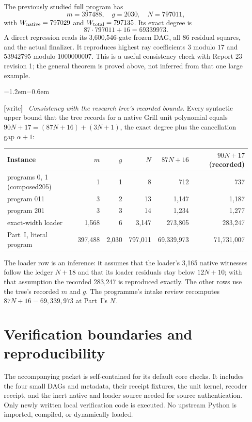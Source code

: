 \documentclass[11pt,letterpaper]{article}
\theoremstyle{definition}\newtheorem{definition}[theorem]{Definition}
\theoremstyle{remark}\newtheorem{remark}[theorem]{Remark}
\newcommand{\wtag}{\textup{[write]}}
\newenvironment{writenote}{\par\smallskip\begin{list}{}{\leftmargin=1.2em\rightmargin=0.6em}\item[]\small\wtag\ }{\end{list}\smallskip}
\begin{document}
The previously studied full program has
\[
 m=397488,\quad g=2030,\quad N=797011,
\]
with $W_{\rm native}=797029$ and $W_{\rm total}=797135$. Its exact degree is
\[
 87\cdot797011+16=69339973.
\]
A direct regression reads its 3,600,546-gate frozen DAG, all 86 residual squares, and the actual finalizer. It reproduces highest ray coefficients $3$ modulo $17$ and $53942795$ modulo $1000000007$. This is a useful consistency check with Report 23 revision 1; the general theorem is proved above, not inferred from that one large example.
\begin{writenote}
\emph{Consistency with the research tree's recorded bounds.} Every syntactic upper bound that the tree records for a native Grill unit polynomial equals $90N+17=(87N+16)+(3N+1)$, the exact degree plus the cancellation gap $\alpha+1$:
\begin{center}\footnotesize
\begin{tabular}{@{}lrrrrr@{}}
\toprule
Instance & $m$ & $g$ & $N$ & $87N+16$ & $90N+17$ (recorded)\\\midrule
programs 0, 1 (composed205) & 1 & 1 & 8 & 712 & 737\\
program 011 & 3 & 2 & 13 & 1,147 & 1,187\\
program 201 & 3 & 3 & 14 & 1,234 & 1,277\\
exact-width loader & 1,568 & 6 & 3,147 & 273,805 & 283,247\\
Part~I, literal program & 397,488 & 2,030 & 797,011 & 69,339,973 & 71,731,007\\\bottomrule
\end{tabular}
\end{center}
The loader row is an inference: it assumes that the loader's 3,165 native witnesses follow the ledger $N+18$ and that its loader residuals stay below $12N+10$; with that assumption the recorded 283,247 is reproduced exactly. The other rows use the tree's recorded $m$ and $g$. The programme's intake review recomputes $87N+16=69{,}339{,}973$ at Part~I's $N$.
\end{writenote}

\section{Verification boundaries and reproducibility}\label{fup:dl:sec:verification}
The accompanying packet is self-contained for its default core checks. It includes the four small DAGs and metadata, their receipt fixtures, the unit kernel, recoder receipt, and the inert native and loader source needed for source authentication. Only newly written local verification code is executed. No upstream Python is imported, compiled, or dynamically loaded.
\end{document}
